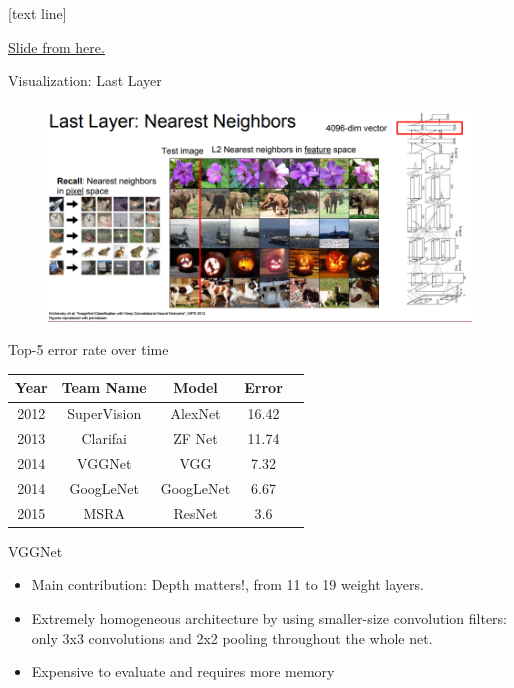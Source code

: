 \documentclass{beamer}
\newcommand{\referencefootnote}[1]{\setbeamertemplate{footline}[text line]{%
\parbox{0.9\paperwidth}{\vspace*{-23pt}\tiny{\textcolor{gray}{#1}}\hfill\scriptsize\insertframenumber}}}
\begin{document}
	{ \referencefootnote{\href{http://cs231n.stanford.edu/slides/2017/cs231n_2017_lecture12.pdf}{Slide from \underline{here}.}}
		\begin{frame}{Visualization: Last Layer} %
						\begin{figure}
            \centering
            \includegraphics[width=0.9\linewidth]{figures/Selection_019.png}
        \end{figure}
	\end{frame}
	}
	
	\begin{frame}{Top-5 error rate over time}%
	\begin{center}
	\begin{table}
	\begin{tabular}{  c   c  c  c   c  } 
	 Year & Team Name & Model & Error \\ 
	\hline
	 2012 &  SuperVision  &  AlexNet &  { \color{red} 16.42  }  \\ 
	2013 & Clarifai     & ZF Net&  {\color{red} 11.74  }  \\ 
	\color{red}2014 & \color{red}VGGNet         &  \color{red}VGG &  {\color{red} 7.32  } \\ 
	2014 & GoogLeNet   & GoogLeNet &  {\color{red}  6.67  } \\ 
	2015 & MSRA          & ResNet &  {\color{red} 3.6  } \\  
	\end{tabular}
	\end{table}  
	\end{center}
	\footnotesize
	VGGNet
	\begin{itemize}
	\item  Main contribution: Depth matters!, from 11 to 19 weight layers.
	\item Extremely homogeneous architecture by using smaller-size convolution filters: only 3x3 convolutions and 2x2 pooling throughout the whole net.
	\item Expensive to evaluate and requires more memory 
	\end{itemize}
	\end{frame} 
\end{document}
